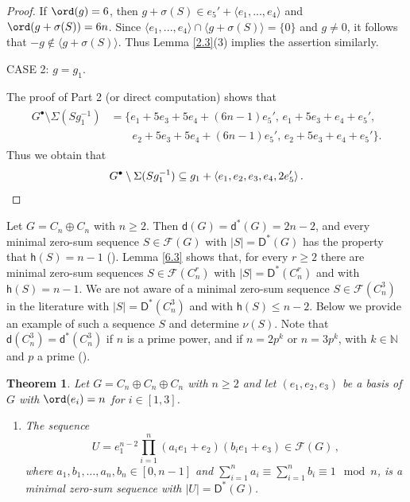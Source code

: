 \documentclass[a4paper, 10pt]{amsart}
\theoremstyle{plain}
\newtheorem{theorem}{\bf Theorem}[section]
\theoremstyle{definition}
\newcommand{\N}{\mathbb N}
\numberwithin{equation}{section}
\begin{document}
{\begin{proof}
If $\ord(g)=6$, then $g+\sigma (S) \in e_5'+\langle e_1,...,e_4\rangle$ and $\ord(g+ \sigma (S))=6n$. Since $\langle e_1,...,e_4\rangle \cap \langle g+\sigma (S) \rangle=\{0\}$ and $g\ne 0$, it follows that  $-g\notin \langle g+\sigma (S) \rangle$. Thus Lemma \ref{2.3}(3) implies the assertion similarly.


	
\smallskip
\noindent
CASE 2: $g=g_1$. 

The proof of Part 2 (or direct computation) shows that
	\begin{align*}
	\begin{aligned}
	G^{\bullet} \setminus \Sigma(Sg_1^{-1})
	&=
	\bigl\{
	e_1+5e_3+5e_4+(6n-1)e_5',\, e_1+5e_3+e_4+e_5',\\
	&\qquad e_2+5e_3+5e_4+(6n-1)e_5',\, e_2+5e_3+e_4+e_5'
	\bigr\}.
	\end{aligned}
	\end{align*}
Thus we obtain that
\[
	G^{\bullet} \setminus \Sigma(Sg_1^{-1})\subseteq
	g_1 + \langle e_1,e_2,e_3, e_4,2e_5' \rangle \,. \qedhere
\]
\end{proof}



\smallskip
Let $G = C_n \oplus C_n$ with $n \ge 2$. Then $\mathsf d (G) = \mathsf d^* (G)=2n-2$, and
every minimal zero-sum sequence $S \in \mathcal F (G)$  with $|S| = \mathsf D^* (G)$ has the property that $\mathsf h (S)=n-1$ (\cite[Theorem 4.2.1]{Ge-Gr-Zh26a}). Lemma \ref{6.3} shows that, for every $r \ge 2$ there are minimal zero-sum sequences $S \in \mathcal F (C_n^r)$ with $|S|= \mathsf D^* (C_n^r)$ and with $\mathsf h (S)=n-1$. We are not aware of a minimal zero-sum sequence $S \in \mathcal F (C_n^3)$ in the literature with $|S|=\mathsf D^* (C_n^3)$ and with $\mathsf h (S) \le n-2$. Below we provide an example of such a sequence $S$ and determine $\nu (S)$. Note that $\mathsf d (C_n^3) = \mathsf d^* (C_n^3)$ if $n$ is a prime power, and if $n = 2p^k$ or $n = 3p^k$, with $k \in \N$ and $p$ a prime (\cite[Section 4]{Sc11b}). 

\begin{theorem} \label{6.6}
	Let $G = C_n \oplus C_n \oplus C_n$ with $n \ge 2$ and let $(e_1, e_2, e_3)$ be a basis of $G$ with $\ord (e_i)=n$ for $i \in [1,3]$.
	\begin{enumerate}
		\item The sequence 
		\[
		U =e_1^{n-2}\prod_{i=1}^n (a_ie_1+e_2)(b_ie_1+e_3) \in \mathcal F (G) \,,
		\]
		where $a_1, b_1, \ldots, a_n, b_n \in [0,n-1]$ and  $\sum_{i=1}^n a_i \equiv \sum_{i=1}^n b_i \equiv 1 \mod{n}$, is a minimal zero-sum sequence with $|U| = \mathsf D^* (G)$.
		

\end{enumerate}
\end{theorem}}
\end{document}
